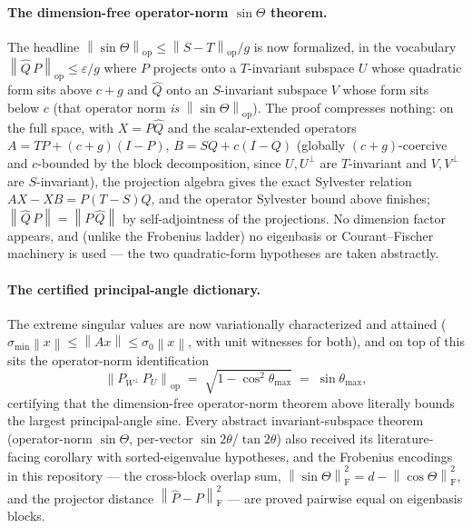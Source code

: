 \documentclass[11pt]{article}
\newcommand{\norm}[1]{\left\lVert #1\right\rVert}
\newcommand{\eps}{\varepsilon}
\newcommand{\F}{\mathrm{F}}
\newcommand{\op}{\mathrm{op}}
\newcommand{\gap}{g}
\newcommand{\sinT}{\sin\Theta}
\theoremstyle{remark}
\begin{document}
\paragraph{The dimension-free operator-norm $\sin\Theta$ theorem.}
The headline $\norm{\sinT}_{\op}\le\norm{S-T}_{\op}/\gap$ is now formalized,
in the vocabulary $\norm{\widehat Q\,P}_{\op}\le\eps/\gap$ where $P$ projects
onto a $T$-invariant subspace $U$ whose quadratic form sits above $c+\gap$ and
$\widehat Q$ onto an $S$-invariant subspace $V$ whose form sits below $c$ (that
operator norm \emph{is} $\norm{\sinT}_{\op}$).  The proof compresses nothing:
on the full space, with $X=P\widehat Q$ and the scalar-extended operators
$A=TP+(c+\gap)(I-P)$, $B=SQ+c(I-Q)$ (globally $(c+\gap)$-coercive and
$c$-bounded by the block decomposition, since $U,U^{\perp}$ are $T$-invariant
and $V,V^{\perp}$ are $S$-invariant), the projection algebra gives the exact
Sylvester relation $AX-XB=P(T-S)Q$, and the operator Sylvester bound above
finishes; $\norm{\widehat Q\,P}=\norm{P\,\widehat Q}$ by self-adjointness of
the projections.  No dimension factor appears, and (unlike the Frobenius
ladder) no eigenbasis or Courant--Fischer machinery is used --- the two
quadratic-form hypotheses are taken abstractly.

\paragraph{The certified principal-angle dictionary.}
The extreme singular values are now variationally characterized and attained
($\sigma_{\min}\norm{x}\le\norm{Ax}\le\sigma_0\norm{x}$, with unit witnesses
for both), and on top of this sits the operator-norm identification
\[
  \norm{P_{W^{\perp}}\,P_U}_{\op}\;=\;\sqrt{1-\cos^2\theta_{\max}}
  \;=\;\sin\theta_{\max},
\]
certifying that the dimension-free operator-norm theorem above literally
bounds the largest principal-angle sine.  Every abstract invariant-subspace
theorem (operator-norm $\sin\Theta$, per-vector $\sin2\theta$/$\tan2\theta$)
also received its literature-facing corollary with sorted-eigenvalue
hypotheses, and the Frobenius encodings in this repository --- the cross-block
overlap sum, $\norm{\sinT}_{\F}^2=d-\norm{\cos\Theta}_{\F}^2$, and the
projector distance $\norm{\widehat P-P}_{\F}^2$ --- are proved pairwise equal
on eigenbasis blocks.
\end{document}
